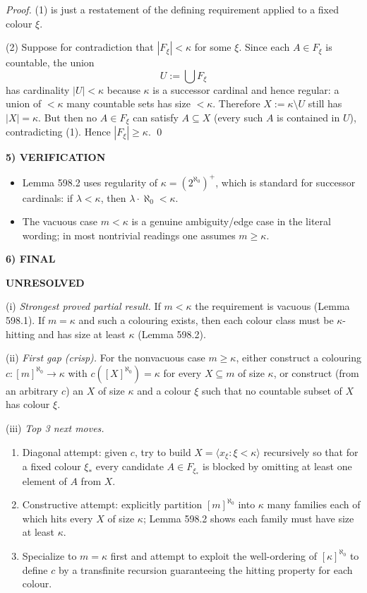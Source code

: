 \noindent\emph{Proof.}
(1) is just a restatement of the defining requirement applied to a fixed colour $\xi$.

(2) Suppose for contradiction that $|F_{\xi}|<\kappa$ for some $\xi$. Since each $A\in F_{\xi}$ is countable, the union
\[
U := \bigcup F_{\xi}
\]
has cardinality $|U|<\kappa$ because $\kappa$ is a successor cardinal and hence regular: a union of $<\kappa$ many countable sets has size $<\kappa$.
Therefore $X:=\kappa\setminus U$ still has $|X|=\kappa$.
But then no $A\in F_{\xi}$ can satisfy $A\subseteq X$ (every such $A$ is contained in $U$), contradicting (1).
Hence $|F_{\xi}|\ge\kappa$. \qed

\noindent\textbf{5) VERIFICATION}\par
\begin{itemize}
\item Lemma 598.2 uses regularity of $\kappa=(2^{\aleph_0})^+$, which is standard for successor cardinals: if $\lambda<\kappa$, then $\lambda\cdot\aleph_0<\kappa$.
\item The vacuous case $m<\kappa$ is a genuine ambiguity/edge case in the literal wording; in most nontrivial readings one assumes $m\ge\kappa$.
\end{itemize}

\noindent\textbf{6) FINAL}\par
\textbf{UNRESOLVED}

(i) \emph{Strongest proved partial result.} If $m<\kappa$ the requirement is vacuous (Lemma 598.1). If $m=\kappa$ and such a colouring exists, then each colour class must be $\kappa$-hitting and has size at least $\kappa$ (Lemma 598.2).

(ii) \emph{First gap (crisp).} For the nonvacuous case $m\ge\kappa$, either construct a colouring $c:[m]^{\aleph_0}\to\kappa$ with $c([X]^{\aleph_0})=\kappa$ for every $X\subseteq m$ of size $\kappa$, or construct (from an arbitrary $c$) an $X$ of size $\kappa$ and a colour $\xi$ such that no countable subset of $X$ has colour $\xi$.

(iii) \emph{Top 3 next moves.}
\begin{enumerate}
\item Diagonal attempt: given $c$, try to build $X={\langle x_{\xi}:\xi<\kappa\rangle}$ recursively so that for a fixed colour $\xi_*$ every candidate $A\in F_{\xi_*}$ is blocked by omitting at least one element of $A$ from $X$.
\item Constructive attempt: explicitly partition $[m]^{\aleph_0}$ into $\kappa$ many families each of which hits every $X$ of size $\kappa$; Lemma 598.2 shows each family must have size at least $\kappa$.
\item Specialize to $m=\kappa$ first and attempt to exploit the well-ordering of $[\kappa]^{\aleph_0}$ to define $c$ by a transfinite recursion guaranteeing the hitting property for each colour.
\end{enumerate}

